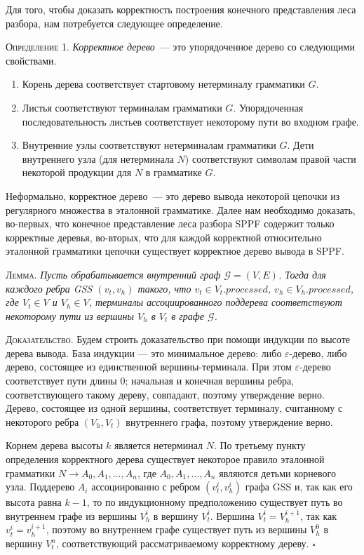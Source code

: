 Для того, чтобы доказать корректность построения конечного представления леса разбора, нам потребуется следующее определение. 

\textsc{Определение 1.} 
\emph{Корректное дерево}~--- это упорядоченное дерево со следующими свойствами.
\begin{enumerate}
  \item Корень дерева соответствует стартовому нетерминалу грамматики $G$.
  \item Листья соответствуют терминалам грамматики $G$. Упорядоченная последовательность листьев соответствует некоторому пути во входном графе.
  \item Внутренние узлы соответствуют нетерминалам грамматики $G$. Дети внутреннего узла (для нетерминала $N$) соответствуют символам правой части некоторой продукции для $N$ в грамматике $G$.
\end{enumerate}

Неформально, корректное дерево~--- это дерево вывода некоторой цепочки из регулярного множества в эталонной грамматике. Далее нам необходимо доказать, во-первых, что конечное представление леса разбора SPPF содержит только корректные деревья, во-вторых, что для каждой корректной относительно эталонной грамматики цепочки существует корректное дерево вывода в SPPF. 

\textsc{Лемма.}
\textit{Пусть обрабатывается внутренний граф $\mathcal{G}=(V,E)$. Тогда для каждого ребра GSS $(v_{t}, v_{h})$ такого, что $v_{t} \in V_{t}.processed$, $v_{h} \in V_{h}.processed$, где $V_{t} \in V$ и $V_{h} \in V$, терминалы ассоциированного поддерева соответствуют некоторому пути из вершины $V_{h}$ в $V_{t}$ в графе $\mathcal{G}$.}

\textsc{Доказательство.}
Будем строить доказательство при помощи индукции по высоте дерева вывода. База индукции --- это минимальное дерево: либо $\varepsilon$-дерево, либо дерево, состоящее из единственной вершины-терминала. При этом $\varepsilon$-дерево соответствует пути длины $0$; начальная и конечная вершины ребра, соответствующего такому дереву, совпадают, поэтому утверждение верно. Дерево, состоящее из одной вершины, соответствует терминалу, считанному с некоторого ребра $(V_{h}, V_{t})$ внутреннего графа, поэтому утверждение верно. 

Корнем дерева высоты $k$ является нетерминал $N$. По третьему пункту определения корректного дерева существует некоторое правило эталонной грамматики $N \rightarrow A_{0}, A_{1}, \dots, A_{n}$, где $A_{0}, A_{1}, \dots, A_{n}$ являются детьми корневого узла. Поддерево $A_{i}$ ассоциированно с ребром $(v_{t}^{i}, v_{h}^{i})$ графа GSS и, так как его высота равна $k-1$, то по индукционному предположению существует путь во внутреннем графе из вершины $V_{h}^{i}$ в вершину $V_{t}^{i}$. Вершина $V_{t}^{i} = V_{h}^{i+1}$, так как $v_{t}^{i} = v_{h}^{i+1}$, поэтому во внутреннем графе существует путь из вершины $V_{h}^{0}$ в вершину $V_{t}^{n}$, соответствующий рассматриваемому корректному дереву. $\square$

